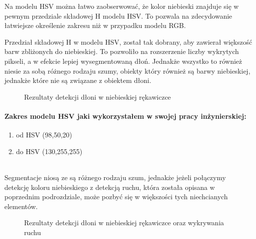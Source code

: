 \documentclass[a4paper,12pt,twoside,openany]{report}
\newcommand{\ImgPath}{.}
\begin{document}
Na modelu HSV można łatwo zaobserwować, że kolor niebieski znajduje się w pewnym przedziale składowej H modelu HSV. To pozwala na zdecydowanie łatwiejsze określenie zakresu niż w przypadku modelu RGB.  

Przedział składowej H w modelu HSV, został tak dobrany, aby zawierał większość barw zbliżonych do niebieskiej. To pozwoliło na rozszerzenie liczby wykrytych pikseli, a w efekcie lepiej wysegmentowaną dłoń. Jednakże wszystko to również niesie za sobą różnego rodzaju szumy, obiekty który również są barwy niebieskiej, jednakże które nie są związane z obiektem dłoni.
\begin{figure}[H]
	\centering
	\caption{Rezultaty detekcji dłoni w niebieskiej rękawiczce}
\end{figure}

\paragraph{Zakres modelu HSV jaki wykorzystałem w swojej pracy inżynierskiej:}
\begin{enumerate}
	\item od HSV (98,50,20)
	\item do HSV (130,255,255)
\end{enumerate}
\mbox{} \\

Segmentacje niosą ze są różnego rodzaju szum, jednakże jeżeli połączymy detekcję koloru niebieskiego z detekcją ruchu, która została opisana w poprzednim podrozdziale, może pozbyć się w większości tych niechcianych elementów. 

\begin{figure}[H]
	\centering
	\caption{Rezultaty detekcji dłoni w niebieskiej rękawiczce oraz wykrywania ruchu}
\end{figure}
\end{document}
